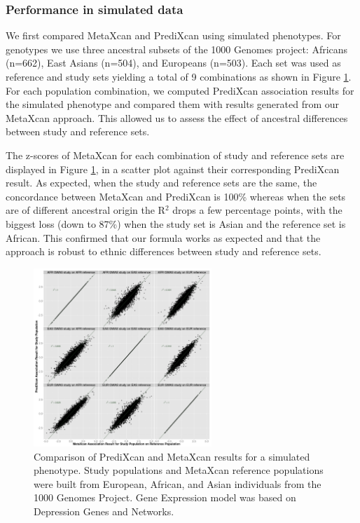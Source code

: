 \documentclass[10pt]{article}
\begin{document}
\subsubsection*{Performance in simulated data}

We first compared MetaXcan and PrediXcan using simulated phenotypes. For genotypes we use three ancestral subsets of the 1000 Genomes project: Africans (n=662), East Asians (n=504), and Europeans (n=503). Each set was used as reference and study sets yielding a total of 9 combinations as shown in Figure \ref{fig:simulatedgrid}. For each population combination, we computed PrediXcan association results for the simulated phenotype and compared them with results generated from our MetaXcan approach. This allowed us to assess the effect of ancestral differences between study and reference sets.

The z-scores of MetaXcan for each combination of study and reference sets are displayed in Figure \ref{fig:simulatedgrid}, in a scatter plot against their corresponding PrediXcan result. As expected, when the study and reference sets are the same, the concordance between MetaXcan and PrediXcan is 100\% whereas when the sets are of different ancestral origin the R$^2$ drops a few percentage points, with the biggest loss (down to 87\%) when the study set is Asian and the reference set is African. This confirmed that our formula works as expected and that the approach is robust to ethnic differences between study and reference sets. 

\begin{figure}
\includegraphics[width=0.6\textwidth]{plots/Fig3-simulated_grid.png}
\caption{Comparison of PrediXcan and MetaXcan results for a simulated phenotype. 
Study populations and MetaXcan reference populations were built from European, African, and Asian
individuals from the 1000 Genomes Project. Gene Expression model was based on Depression Genes and Networks.
}
\label{fig:simulatedgrid}
\end{figure}
\end{document}
